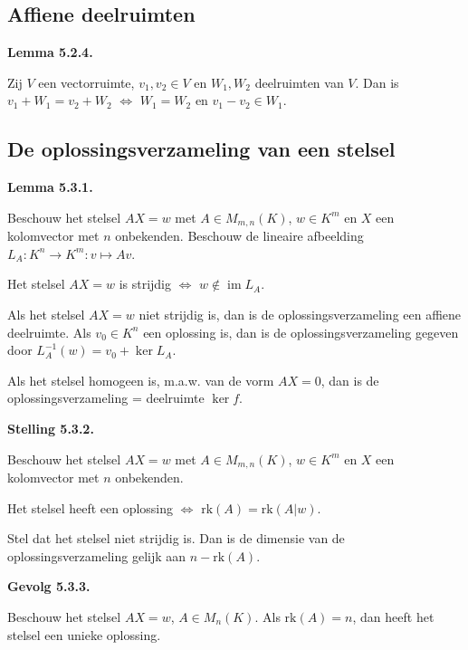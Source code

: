 \documentclass[10pt,a4paper]{article}
\newenvironment{res}[2]{%
  \par\noindent\textbf{#1 #2.}%
}{%
  \par\vspace{2pt}\normalfont
}
\begin{document}
\subsection{Affiene deelruimten}
\begin{res}{Lemma}{5.2.4}
Zij $V$ een vectorruimte, $v_1,v_2\in V$ en $W_1,W_2$ deelruimten van $V$. Dan is $v_1+W_1=v_2+W_2$ \(\iff\) $W_1=W_2$ en $v_1-v_2\in W_1$.
\end{res}

\subsection{De oplossingsverzameling van een stelsel}
\begin{res}{Lemma}{5.3.1}
Beschouw het stelsel $AX=w$ met $A\in M_{m,n}(K)$, $w\in K^m$ en $X$ een kolomvector met $n$ onbekenden. Beschouw de lineaire afbeelding $L_A:K^n\to K^m:v\mapsto Av$.
\begin{myenum}
\item Het stelsel $AX=w$ is strijdig \(\iff\) $w\notin\operatorname{im}L_A$.
\item Als het stelsel $AX=w$ niet strijdig is, dan is de oplossingsverzameling een affiene deelruimte. Als $v_0\in K^n$ een oplossing is, dan is de oplossingsverzameling gegeven door $L_A^{-1}(w)=v_0+\ker L_A$.
\item Als het stelsel homogeen is, m.a.w. van de vorm \(AX=0\), dan is de oplossingsverzameling = deelruimte \(\ker f\).
\end{myenum}
\end{res}

\begin{res}{Stelling}{5.3.2}
Beschouw het stelsel $AX=w$ met $A\in M_{m,n}(K)$, $w\in K^m$ en $X$ een kolomvector met $n$ onbekenden.
\begin{myenum}
\item Het stelsel heeft een oplossing \(\iff\) $\mathrm{rk}(A)=\mathrm{rk}(A|w)$.
\item Stel dat het stelsel niet strijdig is. Dan is de dimensie van de oplossingsverzameling gelijk aan $n-\mathrm{rk}(A)$.
\end{myenum}
\end{res}

\begin{res}{Gevolg}{5.3.3}
Beschouw het stelsel $AX=w$, $A\in M_n(K)$. Als $\mathrm{rk}(A)=n$, dan heeft het stelsel een unieke oplossing.
\end{res}
\end{document}
